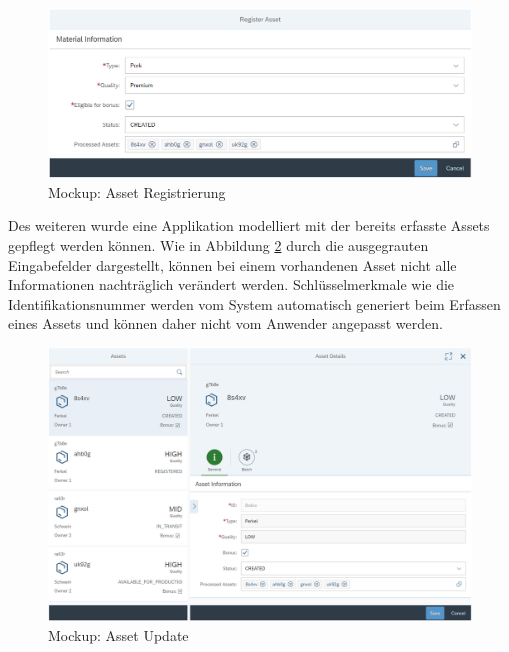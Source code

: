 \begin{figure}[H]
	\centering
	\includegraphics[width=1\linewidth]{pictures/ui-register-asset}
	\caption[Mockup: Asset Registrierung]{Mockup: Asset Registrierung}
	\label{fig:ui-register-asset}
\end{figure}

Des weiteren wurde eine Applikation modelliert mit der bereits erfasste Assets gepflegt werden können. Wie in Abbildung \ref{fig:ui-update-asset} durch die ausgegrauten Eingabefelder dargestellt, können bei einem vorhandenen Asset nicht alle Informationen nachträglich verändert werden. Schlüsselmerkmale wie die Identifikationsnummer werden vom System automatisch generiert beim Erfassen eines Assets und können daher nicht vom Anwender angepasst werden.

\begin{figure}[H]
	\centering
	\includegraphics[width=1\linewidth]{pictures/ui-update-asset}
	\caption[Mockup: Asset Update]{Mockup: Asset Update}
	\label{fig:ui-update-asset}
\end{figure}




